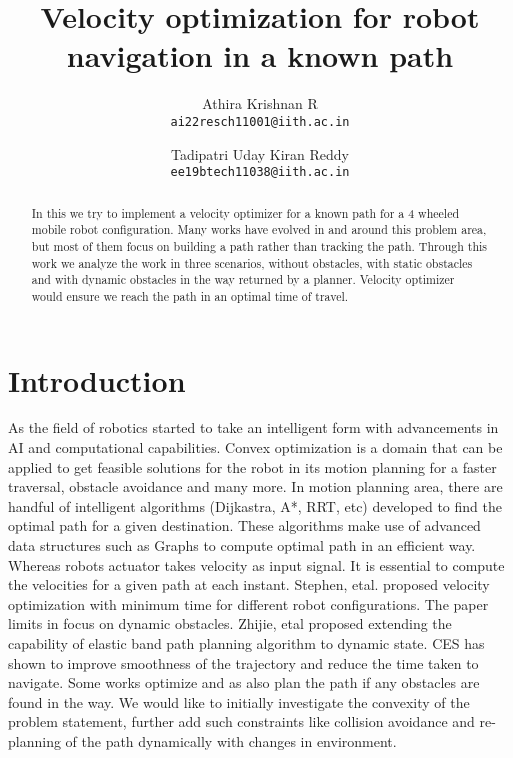 \documentclass[10pt,twocolumn,letterpaper]{article}
\begin{document}
\title{ Velocity optimization for robot navigation in a known path}

\author{Athira Krishnan R \\
{\tt\small ai22resch11001@iith.ac.in}
\and
Tadipatri Uday Kiran Reddy \\
{\tt\small ee19btech11038@iith.ac.in}}



\maketitle

\begin{abstract}
   In this we try to implement a velocity optimizer for a known path for a 4 wheeled mobile robot configuration. Many works have evolved in and around this problem area, but most of them focus on building a path rather than tracking the path. Through this work we analyze the work in three scenarios, without obstacles, with static obstacles and with dynamic obstacles in the way returned by a planner. Velocity optimizer would ensure we reach the path in an optimal time of travel.
\end{abstract}

\section{Introduction}

As the field of robotics started to take an intelligent form with advancements in AI and computational capabilities. Convex optimization is a domain that can be applied to get feasible solutions for the robot in its motion planning for a faster traversal, obstacle avoidance and many more. In motion planning area, there are handful of intelligent algorithms (Dijkastra, A*, RRT, etc) developed to find the optimal path for a given destination. These algorithms make use of advanced data structures such as Graphs to compute optimal path in an efficient way. Whereas robots actuator takes velocity as input signal. It is essential to compute the velocities for a given path at each instant. Stephen, etal. \cite{lipp2014minimum} proposed velocity optimization with minimum time for different robot configurations. The paper limits in focus on dynamic obstacles. Zhijie, etal \cite{zhu2015convex} proposed extending the capability of elastic band path planning algorithm to dynamic state. CES has shown to improve smoothness of the trajectory and reduce the time taken to navigate. Some works \cite{schulan} optimize and as also plan the path if any obstacles are found in the way. We would like to initially investigate the convexity of the problem statement, further add such constraints like collision avoidance and re-planning of the path dynamically with changes in environment.\citep{lipp2014minimum}
\end{document}
